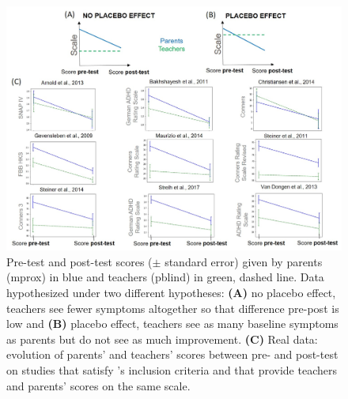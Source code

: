 \begin{figure}[h!]
  \centering
  \includegraphics[width=1.0\linewidth]{figures/discussion_on_placebo_effect_colors_2-columns_fitting_image.jpg}
  \caption{Pre-test and post-test scores ($\pm$ standard error) given by parents (\gls{mprox}) in blue and teachers (\gls{pblind}) in green, dashed line. 
	Data hypothesized under two different hypotheses: \textbf{(A)} no placebo effect, teachers see fewer symptoms altogether so that difference pre-post is low and 
	\textbf{(B)} placebo effect, teachers see as many baseline symptoms as parents but do not see as much improvement. \textbf{(C)} Real data: evolution of parents' 
	and teachers' scores between pre- and post-test on studies that satisfy \citeauthor{Cortese2016}'s inclusion criteria and that provide teachers and parents'
	scores on the same scale.}
  \label{Figure:discussion_on_placebo_effect_colors_2-columns_fitting_image}
\end{figure} 
